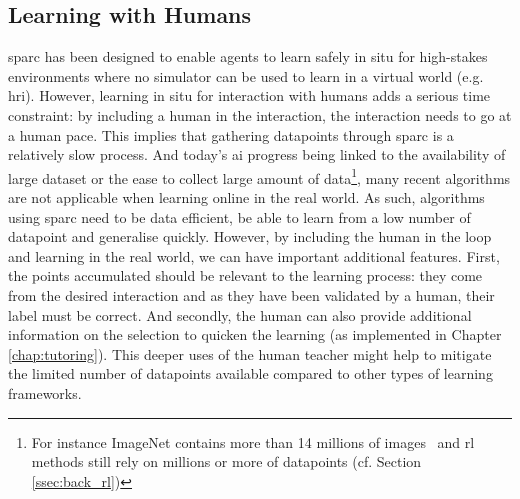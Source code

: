 \subsection{Learning with Humans}


\gls{sparc} has been designed to enable agents to learn safely in situ for high-stakes environments where no simulator can be used to learn in a virtual world (e.g. \gls{hri}). However, learning in situ for interaction with humans adds a serious time constraint: by including a human in the interaction, the interaction needs to go at a human pace. This implies that gathering datapoints through \gls{sparc} is a relatively slow process. And today's \gls{ai} progress being linked to the availability of large dataset or the ease to collect large amount of data\footnote{For instance ImageNet contains more than 14 millions of images~\citep{russakovsky2015imagenet} and \gls{rl} methods still rely on millions or more of datapoints (cf. Section \ref{ssec:back_rl})}, many recent algorithms are not applicable when learning online in the real world. As such, algorithms using \gls{sparc} need to be data efficient, be able to learn from a low number of datapoint and generalise quickly. However, by including the human in the loop and learning in the real world, we can have important additional features. First, the points accumulated should be relevant to the learning process: they come from the desired interaction and as they have been validated by a human, their label must be correct. And secondly, the human can also provide additional information on the selection to quicken the learning (as implemented in Chapter \ref{chap:tutoring}). This deeper uses of the human teacher might help to mitigate the limited number of datapoints available compared to other types of learning frameworks.



